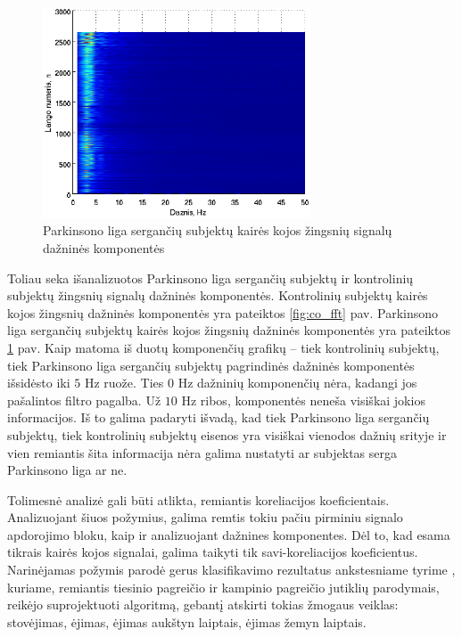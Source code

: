 \documentclass[]{vgtuef}
\begin{document}
\begin{figure}[!t]
  \centering
  \includegraphics[width=300px]{figures/pt_fft.eps}
  \caption{Parkinsono liga sergančių subjektų kairės kojos žingsnių signalų dažninės komponentės}
  \label{fig:pt_fft}
\end{figure}


Toliau seka išanalizuotos Parkinsono liga sergančių subjektų ir kontrolinių subjektų žingsnių signalų dažninės komponentės. Kontrolinių subjektų kairės kojos žingsnių dažninės komponentės yra pateiktos \ref{fig:co_fft} pav. Parkinsono liga sergančių subjektų kairės kojos žingsnių dažninės komponentės yra pateiktos \ref{fig:pt_fft} pav. Kaip matoma iš duotų komponenčių grafikų -- tiek kontrolinių subjektų, tiek Parkinsono liga sergančių subjektų pagrindinės dažninės komponentės išsidėsto iki $5$ Hz ruože. Ties $0$ Hz dažninių komponenčių nėra, kadangi jos pašalintos filtro pagalba. Už $10$ Hz ribos, komponentės neneša visiškai jokios informacijos. Iš to galima padaryti išvadą, kad tiek Parkinsono liga sergančių subjektų, tiek kontrolinių subjektų eisenos yra visiškai vienodos dažnių srityje ir vien remiantis šita informacija nėra galima nustatyti ar subjektas serga Parkinsono liga ar ne.

Tolimesnė analizė gali būti atlikta, remiantis koreliacijos koeficientais. Analizuojant šiuos požymius, galima remtis tokiu pačiu pirminiu signalo apdorojimo bloku, kaip ir analizuojant dažnines komponentes. Dėl to, kad esama tikrais kairės kojos signalai, galima taikyti tik savi-koreliacijos koeficientus. Narinėjamas požymis parodė gerus klasifikavimo rezultatus ankstesniame tyrime \cite{mano_darbas}, kuriame, remiantis tiesinio pagreičio ir kampinio pagreičio jutiklių parodymais, reikėjo suprojektuoti algoritmą, gebantį atskirti tokias žmogaus veiklas: stovėjimas, ėjimas, ėjimas aukštyn laiptais, ėjimas žemyn laiptais.
\end{document}

